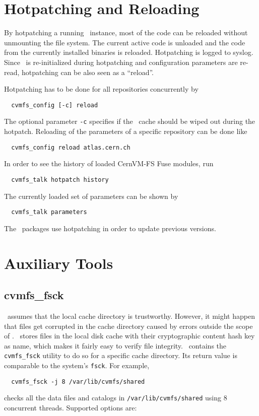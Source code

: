 \section{Hotpatching and Reloading}
\label{sct:hotpatch}

By hotpatching a running \cvmfs\ instance, most of the code can be reloaded without unmounting the file system.
The current active code is unloaded and the code from the currently installed binaries is reloaded.
Hotpatching is logged to syslog.
Since \cvmfs\ is re-initialized during hotpatching and configuration parameters are re-read, hotpatching can be also seen as a ``reload''.

Hotpatching has to be done for all repositories concurrently by
\begin{verbatim}
  cvmfs_config [-c] reload
\end{verbatim}
The optional parameter \texttt{-c} specifies if the \cvmfs\ cache should be wiped out during the hotpatch.
Reloading of the parameters of a specific repository can be done like
\begin{verbatim}
  cvmfs_config reload atlas.cern.ch
\end{verbatim}
In order to see the history of loaded CernVM-FS Fuse modules, run
\begin{verbatim}
  cvmfs_talk hotpatch history
\end{verbatim}
The currently loaded set of parameters can be shown by
\begin{verbatim}
  cvmfs_talk parameters
\end{verbatim}
The \cvmfs\ packages use hotpatching in order to update previous versions.


\section{Auxiliary Tools}
\label{sct:tools}

\subsection{cvmfs\_fsck}
\cvmfs\ assumes that the local cache directory is trustworthy.
However, it might happen that files get corrupted in the cache directory caused by errors outside the scope of \cvmfs.
\cvmfs\ stores files in the local disk cache with their cryptographic content hash key as name, which makes it fairly easy to verify file integrity.
\cvmfs\ contains the \texttt{cvmfs\_fsck} utility to do so for a specific cache directory. 
Its return value is comparable to the system's \texttt{fsck}.
For example,
\begin{verbatim}
  cvmfs_fsck -j 8 /var/lib/cvmfs/shared
\end{verbatim}
checks all the data files and catalogs in \texttt{/var/lib/cvmfs/shared} using 8 concurrent threads.  
Supported options are:

